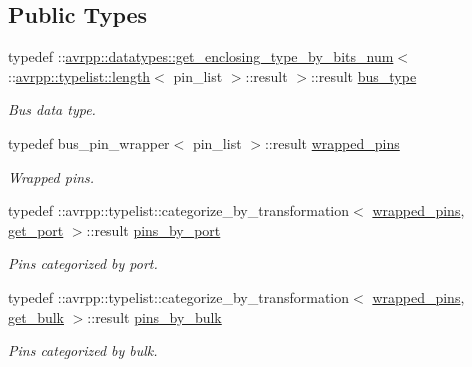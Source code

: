 \subsection*{Public Types}
\begin{DoxyCompactItemize}
\item 
typedef ::\hyperlink{structavrpp_1_1datatypes_1_1get__enclosing__type__by__bits__num}{avrpp::datatypes::get\_\-enclosing\_\-type\_\-by\_\-bits\_\-num}$<$ ::\hyperlink{structavrpp_1_1typelist_1_1length}{avrpp::typelist::length}$<$ pin\_\-list $>$::result $>$::result \hyperlink{structavrpp_1_1bus_1_1input__bus_aa1146b9861eb713a67224e329e4244a9}{bus\_\-type}
\begin{DoxyCompactList}\small\item\em Bus data type. \item\end{DoxyCompactList}\item 
typedef bus\_\-pin\_\-wrapper$<$ pin\_\-list $>$::result \hyperlink{structavrpp_1_1bus_1_1input__bus_a3b24c1489f5178105f4edbe7db7d3e89}{wrapped\_\-pins}
\begin{DoxyCompactList}\small\item\em Wrapped pins. \item\end{DoxyCompactList}\item 
typedef ::avrpp::typelist::categorize\_\-by\_\-transformation$<$ \hyperlink{structavrpp_1_1bus_1_1input__bus_a3b24c1489f5178105f4edbe7db7d3e89}{wrapped\_\-pins}, \hyperlink{structavrpp_1_1bus_1_1get__port}{get\_\-port} $>$::result \hyperlink{structavrpp_1_1bus_1_1input__bus_a991bf34f4a8c2228bcc1f10223b2f985}{pins\_\-by\_\-port}
\begin{DoxyCompactList}\small\item\em Pins categorized by port. \item\end{DoxyCompactList}\item 
typedef ::avrpp::typelist::categorize\_\-by\_\-transformation$<$ \hyperlink{structavrpp_1_1bus_1_1input__bus_a3b24c1489f5178105f4edbe7db7d3e89}{wrapped\_\-pins}, \hyperlink{structavrpp_1_1bus_1_1get__bulk}{get\_\-bulk} $>$::result \hyperlink{structavrpp_1_1bus_1_1input__bus_afa02571f7cf5fd65f26332cf2b7a51e3}{pins\_\-by\_\-bulk}
\begin{DoxyCompactList}\small\item\em Pins categorized by bulk. \item\end{DoxyCompactList}\item 

\end{DoxyCompactItemize}
